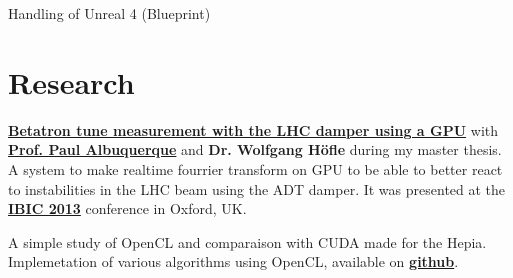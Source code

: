 \documentclass[a4paper]{deedy-resume} %
\begin{document}
\begin{minipage}[t]{0.66\textwidth}
\sectionspace


	\begin{tightitemize}
		\item Handling of Unreal 4 (Blueprint)
	\end{tightitemize}

\sectionspace



\section{Research}

	\textbf{\href{http://cds.cern.ch/record/1545785?ln=en}
		{Betatron tune measurement with the LHC damper using a GPU}}
	with
	\textbf{\href{http://ch.linkedin.com/pub/paul-albuquerque/12/366/809}
		{Prof. Paul Albuquerque}}
	and \textbf{Dr. Wolfgang Höf\/le} during my master thesis.
	A system to make realtime fourrier transform
	on GPU to be able to better react to instabilities in the LHC beam using the ADT
	damper. It was presented at the
	\textbf{\href{http://www.ibic2013.org}{IBIC 2013}}
	conference in Oxford, UK.

\sectionspace %


	A simple study of OpenCL and comparaison with CUDA made for the Hepia. Implemetation
	of various algorithms using OpenCL, available on
	\textbf{\href{https://github.com/anirul/OpenCL\_PA\_2012}{github}}.

\sectionspace

\end{minipage}%
\hfill%
%
%
\end{document}
